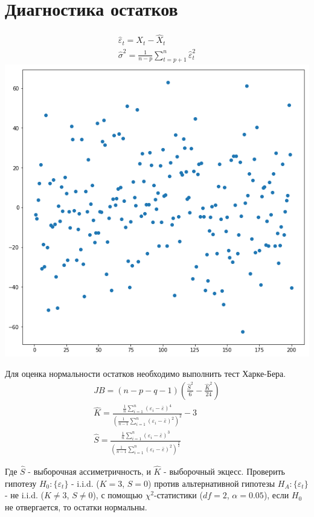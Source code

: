 \documentclass{article}
\begin{document}
\section{Диагностика остатков}
\begin{gather*}
    \hat{\varepsilon}_t=X_t-\hat{X}_t\\
    \hat{\sigma}^2 = \frac{1}{n-p}\sum_{t=p+1}^{n}\hat{\varepsilon}_t^2
\end{gather*}
\includegraphics[width=\linewidth]{resid.png}

Для оценка нормальности остатков необходимо выполнить тест Харке-Бера.\newline
\begin{gather*}
    JB = (n-p-q-1)(\frac{\hat{S}^2}{6}-\frac{\hat{K}^2}{24})\\
    \hat{K} = \frac{\frac{1}{n}\sum_{i=1}^n(\varepsilon_i-\bar{\varepsilon})^4}{(\frac{1}{n-1}\sum_{i=1}^{n}(\varepsilon_i-\bar{\varepsilon})^2)^2}-3\\
    \hat{S} = \frac{\frac{1}{n}\sum_{i=1}^n(\varepsilon_i-\bar{\varepsilon})^3}{(\frac{1}{n-1}\sum_{i=1}^{n}(\varepsilon_i-\bar{\varepsilon})^2)^{\frac{3}{2}}}
\end{gather*}

Где $\hat{S}$ - выборочная ассиметричность, и $\hat{K}$ - выборочный экцесс.\newline
Проверить гипотезу $H_0: \{\varepsilon_t\}$ - i.i.d. ($K=3$, $S=0$) против альтернативной гипотезы $H_A: \{\varepsilon_t\}$ - не i.i.d. ($K\neq3$, $S\neq0$), с помощью $\chi^2$-статистики ($df=2$, $\alpha=0.05$), если $H_0$ не отвергается, то остатки нормальны.\newline
\end{document}
